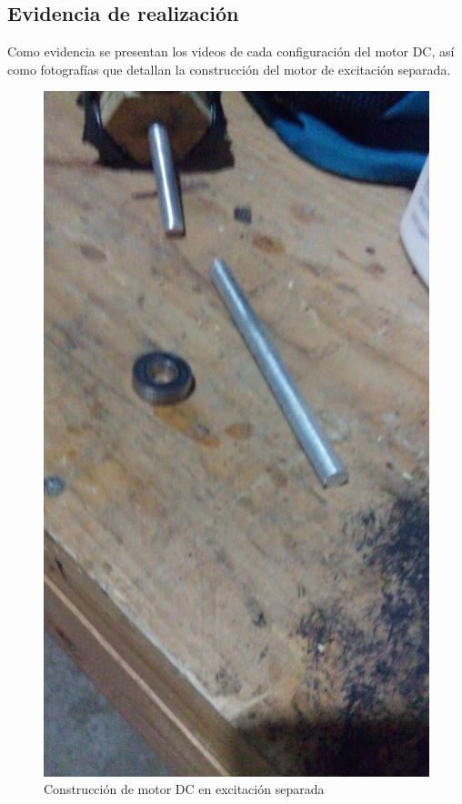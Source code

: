 
\subsection{Evidencia de realizaci\'on}
Como evidencia se presentan los videos de cada configuraci\'on del motor DC, as\'i como fotograf\'ias que 
detallan la construcci\'on del motor de excitaci\'on separada.

\begin{figure}[!htbp]
\caption{Construcci\'on de motor DC en excitaci\'on separada}
\centering
\includegraphics [scale=0.25]
{./img/20160228_190823.jpg}
\end{figure}

